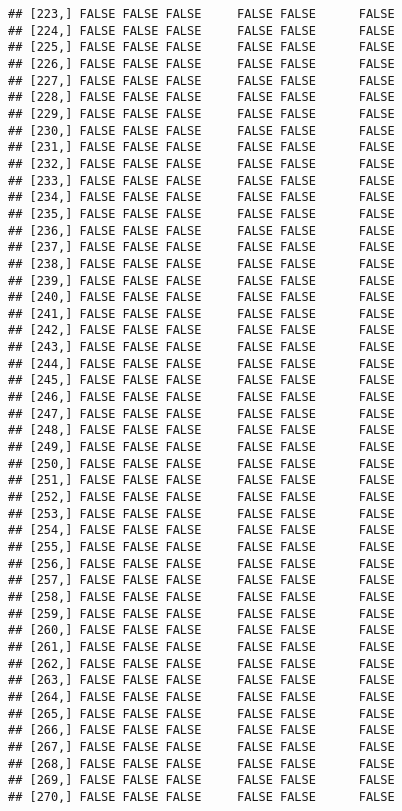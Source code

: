 \documentclass[
]{article}
\begin{document}
\begin{verbatim}
## [223,] FALSE FALSE FALSE     FALSE FALSE      FALSE
## [224,] FALSE FALSE FALSE     FALSE FALSE      FALSE
## [225,] FALSE FALSE FALSE     FALSE FALSE      FALSE
## [226,] FALSE FALSE FALSE     FALSE FALSE      FALSE
## [227,] FALSE FALSE FALSE     FALSE FALSE      FALSE
## [228,] FALSE FALSE FALSE     FALSE FALSE      FALSE
## [229,] FALSE FALSE FALSE     FALSE FALSE      FALSE
## [230,] FALSE FALSE FALSE     FALSE FALSE      FALSE
## [231,] FALSE FALSE FALSE     FALSE FALSE      FALSE
## [232,] FALSE FALSE FALSE     FALSE FALSE      FALSE
## [233,] FALSE FALSE FALSE     FALSE FALSE      FALSE
## [234,] FALSE FALSE FALSE     FALSE FALSE      FALSE
## [235,] FALSE FALSE FALSE     FALSE FALSE      FALSE
## [236,] FALSE FALSE FALSE     FALSE FALSE      FALSE
## [237,] FALSE FALSE FALSE     FALSE FALSE      FALSE
## [238,] FALSE FALSE FALSE     FALSE FALSE      FALSE
## [239,] FALSE FALSE FALSE     FALSE FALSE      FALSE
## [240,] FALSE FALSE FALSE     FALSE FALSE      FALSE
## [241,] FALSE FALSE FALSE     FALSE FALSE      FALSE
## [242,] FALSE FALSE FALSE     FALSE FALSE      FALSE
## [243,] FALSE FALSE FALSE     FALSE FALSE      FALSE
## [244,] FALSE FALSE FALSE     FALSE FALSE      FALSE
## [245,] FALSE FALSE FALSE     FALSE FALSE      FALSE
## [246,] FALSE FALSE FALSE     FALSE FALSE      FALSE
## [247,] FALSE FALSE FALSE     FALSE FALSE      FALSE
## [248,] FALSE FALSE FALSE     FALSE FALSE      FALSE
## [249,] FALSE FALSE FALSE     FALSE FALSE      FALSE
## [250,] FALSE FALSE FALSE     FALSE FALSE      FALSE
## [251,] FALSE FALSE FALSE     FALSE FALSE      FALSE
## [252,] FALSE FALSE FALSE     FALSE FALSE      FALSE
## [253,] FALSE FALSE FALSE     FALSE FALSE      FALSE
## [254,] FALSE FALSE FALSE     FALSE FALSE      FALSE
## [255,] FALSE FALSE FALSE     FALSE FALSE      FALSE
## [256,] FALSE FALSE FALSE     FALSE FALSE      FALSE
## [257,] FALSE FALSE FALSE     FALSE FALSE      FALSE
## [258,] FALSE FALSE FALSE     FALSE FALSE      FALSE
## [259,] FALSE FALSE FALSE     FALSE FALSE      FALSE
## [260,] FALSE FALSE FALSE     FALSE FALSE      FALSE
## [261,] FALSE FALSE FALSE     FALSE FALSE      FALSE
## [262,] FALSE FALSE FALSE     FALSE FALSE      FALSE
## [263,] FALSE FALSE FALSE     FALSE FALSE      FALSE
## [264,] FALSE FALSE FALSE     FALSE FALSE      FALSE
## [265,] FALSE FALSE FALSE     FALSE FALSE      FALSE
## [266,] FALSE FALSE FALSE     FALSE FALSE      FALSE
## [267,] FALSE FALSE FALSE     FALSE FALSE      FALSE
## [268,] FALSE FALSE FALSE     FALSE FALSE      FALSE
## [269,] FALSE FALSE FALSE     FALSE FALSE      FALSE
## [270,] FALSE FALSE FALSE     FALSE FALSE      FALSE

\end{verbatim}
\end{document}

